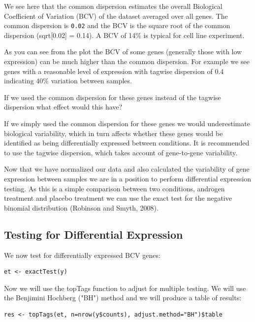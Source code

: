 \begin{steps}
\begin{information}
We see here that the common dispersion estimates the overall Biological Coefficient of
Variation (BCV) of the dataset averaged over all genes. The common dispersion is
\texttt{0.02} and the BCV is the square root of the common dispersion (sqrt[0.02] = 0.14).
A BCV of 14\% is typical for cell line experiment.

As you can see from the plot the BCV of some genes (generally those with low expression) can be much higher than the common dispersion. For example we see genes with a reasonable level of expression with tagwise dispersion of 0.4 indicating 40\% variation between samples. 
\end{information}


\begin{questions}
If we used the common dispersion for these genes instead of the tagwise dispersion what effect would this have?	
\end{questions}


\begin{information}
If we simply used the common dispersion for these genes we would underestimate biological variability, which in turn affects whether these genes would be identified as being differentially expressed between conditions.
It is recommended to use the tagwise dispersion, which takes account of gene-to-gene variability.
	
\end{information}
Now that we have normalized our data and also calculated the variability of gene expression between samples we are in a position to perform differential expression testing.
As this is a simple comparison between two conditions, androgen treatment and placebo treatment we can use the exact test for the negative binomial distribution (Robinson and Smyth, 2008). 

\subsection{Testing for Differential Expression}
\begin{steps}
We now test for differentially expressed BCV genes:
\begin{lstlisting}
et <- exactTest(y)
\end{lstlisting}


Now we will use the topTags function to adjust for multiple testing. We will use the
Benjimini Hochberg ("BH") method and we will produce a table of results:
\begin{lstlisting}
res <- topTags(et, n=nrow(y$counts), adjust.method="BH")$table
\end{lstlisting}


\end{steps}
\end{steps}
